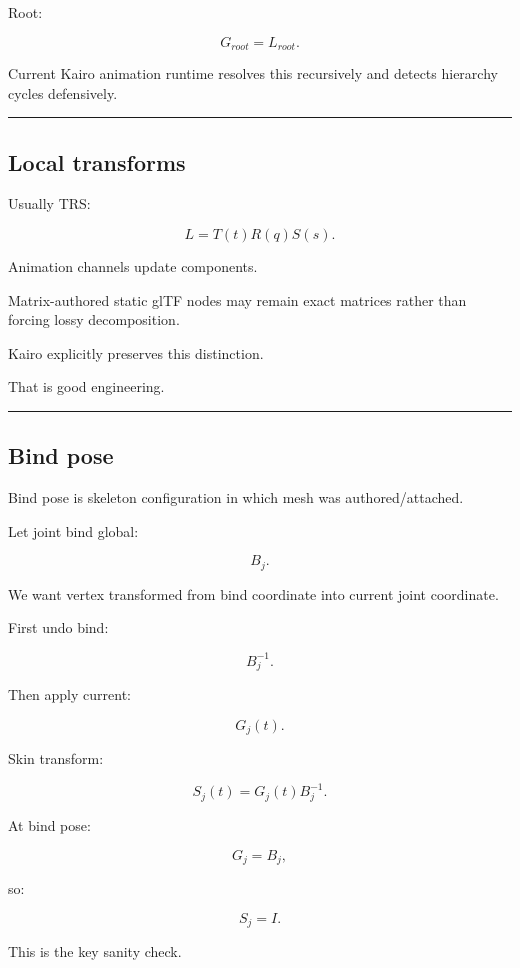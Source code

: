 Root:

\[
G_{root}=L_{root}.
\]

Current Kairo animation runtime resolves this recursively and detects hierarchy cycles defensively.

\begin{center}\rule{0.5\linewidth}{0.5pt}\end{center}

\subsection{Local transforms}\label{04-visual-computing-ii-ch041-local-transforms}

Usually TRS:

\[
L=
T(t)
R(q)
S(s).
\]

Animation channels update components.

Matrix-authored static glTF nodes may remain exact matrices rather than forcing lossy decomposition.

Kairo explicitly preserves this distinction.

That is good engineering.

\begin{center}\rule{0.5\linewidth}{0.5pt}\end{center}

\subsection{Bind pose}\label{04-visual-computing-ii-ch041-bind-pose}

Bind pose is skeleton configuration in which mesh was authored/attached.

Let joint bind global:

\[
B_j.
\]

We want vertex transformed from bind coordinate into current joint coordinate.

First undo bind:

\[
B_j^{-1}.
\]

Then apply current:

\[
G_j(t).
\]

Skin transform:

\[
\boxed{
S_j(t)
=
G_j(t)
B_j^{-1}.
}
\]

At bind pose:

\[
G_j=B_j,
\]

so:

\[
S_j=
I.
\]

This is the key sanity check.

